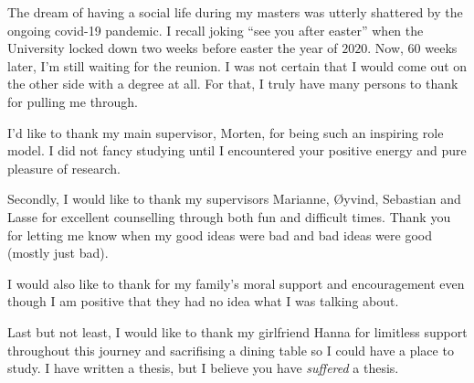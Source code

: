 
The dream of having a social life during my masters was utterly shattered by the ongoing covid-19 pandemic. I recall joking ``see you after easter'' when the University locked down two weeks before easter the year of $2020$. Now, $60$ weeks later, I'm still waiting for the reunion.
I was not certain that I would come out on the other side with a degree at all. For that, I truly have many persons to thank for pulling me through.


I'd like to thank my main supervisor, Morten, for being such an inspiring role model. I did not fancy studying until I encountered your positive energy and pure pleasure of research.


Secondly, I would like to thank my supervisors Marianne, Øyvind, Sebastian and Lasse for excellent counselling through both fun and difficult times. Thank you for letting me know when my good ideas were bad and bad ideas were good (mostly just bad).


I would also like to thank for my family's moral support and encouragement even though I am positive that they had no idea what I was talking about.


Last but not least, I would like to thank my girlfriend Hanna for limitless support throughout this journey and sacrifising a dining table so I could have a place to study. I have written a thesis, but I believe you have \emph{suffered} a thesis.
